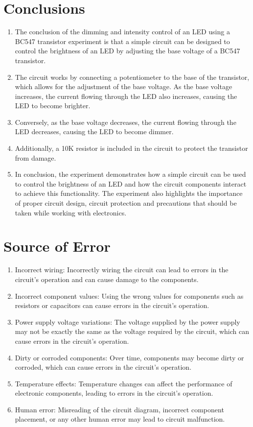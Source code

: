 \documentclass[12pt]{article}
\begin{document}
    
    
    
    

    
\section{Conclusions}
    \begin{enumerate}
        \item The conclusion of the dimming and intensity control of an LED using a  BC547 transistor experiment is that a simple circuit can be designed to  control the brightness of an LED by adjusting the base voltage of a BC547  transistor.  
        \item The circuit works by connecting a potentiometer to the base of the  transistor, which allows for the adjustment of the base voltage. As the base  voltage increases, the current flowing through the LED also increases,  causing the LED to become brighter.  
        \item Conversely, as the base voltage decreases, the current flowing through the  LED decreases, causing the LED to become dimmer. 
        \item Additionally, a 10K resistor is included in the circuit to protect the transistor  from damage.
        \item In conclusion, the experiment demonstrates how a simple circuit can be  used to control the brightness of an LED and how the circuit components  interact to achieve this functionality. The experiment also highlights the  importance of proper circuit design, circuit protection and precautions that  should be taken while working with electronics.
    \end{enumerate}
\section{Source of Error}
    \begin{enumerate}
        \item Incorrect wiring: Incorrectly wiring the circuit can lead to errors in the  circuit's operation and can cause damage to the components.
        \item Incorrect component values: Using the wrong values for components  such as resistors or capacitors can cause errors in the circuit's  operation. 
        \item Power supply voltage variations: The voltage supplied by the power  supply may not be exactly the same as the voltage required by the  circuit, which can cause errors in the circuit's operation.
        \item Dirty or corroded components: Over time, components may become  dirty or corroded, which can cause errors in the circuit's operation.
        \item Temperature effects: Temperature changes can affect the performance  of electronic components, leading to errors in the circuit's operation.
        \item Human error: Misreading of the circuit diagram, incorrect component  placement, or any other human error may lead to circuit malfunction. 
    \end{enumerate}
\end{document}
